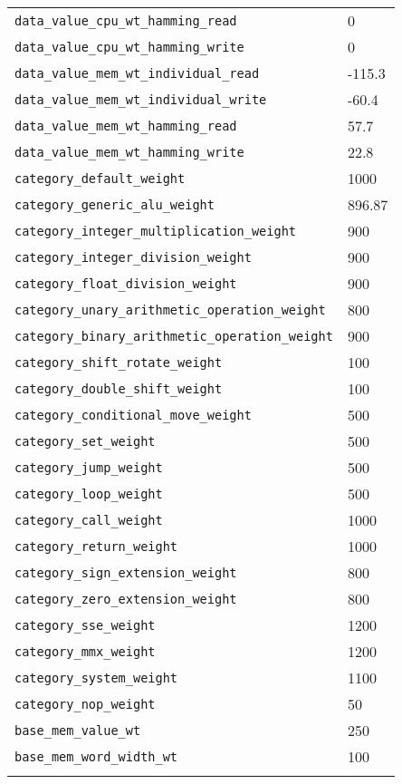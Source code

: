 \begin{longtable}{l|l}
  \texttt{data\_value\_cpu\_wt\_hamming\_read} & 0 \\
  \texttt{data\_value\_cpu\_wt\_hamming\_write} & 0 \\

  \texttt{data\_value\_mem\_wt\_individual\_read} & -115.3 \\
  \texttt{data\_value\_mem\_wt\_individual\_write} & -60.4 \\

  \texttt{data\_value\_mem\_wt\_hamming\_read} & 57.7 \\
  \texttt{data\_value\_mem\_wt\_hamming\_write} & 22.8 \\

  \texttt{category\_default\_weight} & 1000 \\
  \texttt{category\_generic\_alu\_weight} & 896.87 \\
  \texttt{category\_integer\_multiplication\_weight} & 900 \\
  \texttt{category\_integer\_division\_weight} & 900 \\
  \texttt{category\_float\_division\_weight} & 900 \\
  \texttt{category\_unary\_arithmetic\_operation\_weight} & 800 \\
  \texttt{category\_binary\_arithmetic\_operation\_weight} & 900 \\
  \texttt{category\_shift\_rotate\_weight} & 100 \\
  \texttt{category\_double\_shift\_weight} & 100 \\
  \texttt{category\_conditional\_move\_weight} & 500 \\
  \texttt{category\_set\_weight} & 500 \\
  \texttt{category\_jump\_weight} & 500 \\
  \texttt{category\_loop\_weight} & 500 \\
  \texttt{category\_call\_weight} & 1000 \\
  \texttt{category\_return\_weight} & 1000 \\
  \texttt{category\_sign\_extension\_weight} & 800 \\
  \texttt{category\_zero\_extension\_weight} & 800 \\
  \texttt{category\_sse\_weight} & 1200 \\
  \texttt{category\_mmx\_weight} & 1200 \\
  \texttt{category\_system\_weight} & 1100 \\
  \texttt{category\_nop\_weight} & 50 \\

  \texttt{base\_mem\_value\_wt} & 250 \\
  \texttt{base\_mem\_word\_width\_wt} & 100 \\

  \hline \\
\end{longtable}
